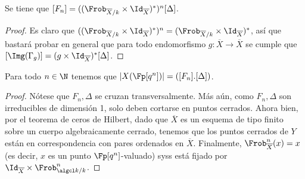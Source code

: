 \begin{lem}\label{lem:frob_is_def_of_diag}
	Se tiene que $[ F_n ] = ( (\Frob_{\overline{X}/k} \times \Id_{\overline{X}})^* )^n[\Delta]$.
\end{lem}
\begin{proof}
	Es claro que $( (\Frob_{\overline{X}/k} \times \Id_{\overline{X}})^* )^n = (\Frob_{\overline{X}/k} \times \Id_{\overline{X}})^*$,
	así que bastará probar en general que para todo endomorfismo $g \colon \overline{X} \to \overline{X}$ se cumple que
	$[ \Img(\Gamma_g) ] = (g \times \Id_{\overline{X}})^*[ \Delta ]$.
\end{proof}

\begin{lem}
	Para todo $n \in \N$ tenemos que $|X(\Fp[q^n])| = ( [ F_n ].[ \Delta ] )$.
\end{lem}
\begin{proof}
	Nótese que $F_n, \Delta$ se cruzan transversalmente.
	Más aún, como $F_n, \Delta$ son irreducibles de dimensión 1, solo deben cortarse en puntos cerrados.
	Ahora bien, por el teorema de ceros de Hilbert, dado que $\overline{X}$ es un esquema de tipo finito sobre un cuerpo algebraicamente cerrado,
	tenemos que los puntos cerrados de $Y$ están en correspondencia con pares ordenados en $\overline{X}$.
	Finalmente, $\Frob_{\overline{X}}^n(x) = x$ (es decir, $x$ es un punto $\Fp[q^n]$-valuado) syss
	está fijado por $\Id_{\overline{X}} \times \Frob_{\algcl k/k}^n$.
\end{proof}

